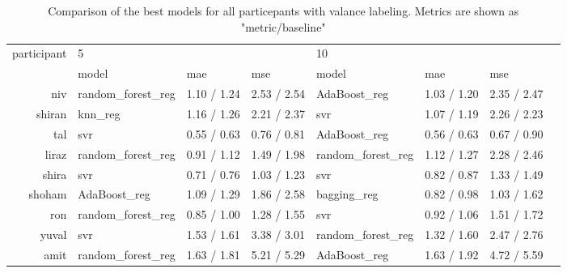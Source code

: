 \begin{table}[!h]
    \begin{tabular}{rlllllll}
        \toprule
        participant &  \multicolumn{3}{l}{5} & \multicolumn{3}{l}{10} \\
              &              model & mae & mse &              model & mae & mse \\
        \midrule
            niv &  random\_forest\_reg &         1.10 / 1.24 &        2.53 / 2.54 &       AdaBoost\_reg &         1.03 / 1.20 &        2.35 / 2.47 \\
         shiran &            knn\_reg &         1.16 / 1.26 &        2.21 / 2.37 &                svr &         1.07 / 1.19 &        2.26 / 2.23 \\
            tal &                svr &         0.55 / 0.63 &        0.76 / 0.81 &       AdaBoost\_reg &         0.56 / 0.63 &        0.67 / 0.90 \\
          liraz &  random\_forest\_reg &         0.91 / 1.12 &        1.49 / 1.98 &  random\_forest\_reg &         1.12 / 1.27 &        2.28 / 2.46 \\
          shira &                svr &         0.71 / 0.76 &        1.03 / 1.23 &                svr &         0.82 / 0.87 &        1.33 / 1.49 \\
         shoham &       AdaBoost\_reg &         1.09 / 1.29 &        1.86 / 2.58 &        bagging\_reg &         0.82 / 0.98 &        1.03 / 1.62 \\
            ron &  random\_forest\_reg &         0.85 / 1.00 &        1.28 / 1.55 &                svr &         0.92 / 1.06 &        1.51 / 1.72 \\
          yuval &                svr &         1.53 / 1.61 &        3.38 / 3.01 &  random\_forest\_reg &         1.32 / 1.60 &        2.47 / 2.76 \\
           amit &  random\_forest\_reg &         1.63 / 1.81 &        5.21 / 5.29 &       AdaBoost\_reg &         1.63 / 1.92 &        4.72 / 5.59 \\
        \bottomrule
    \end{tabular}        
    \caption{Comparison of the best models for all particepants with valance labeling. Metrics are shown as "metric/baseline"}
\end{table}

